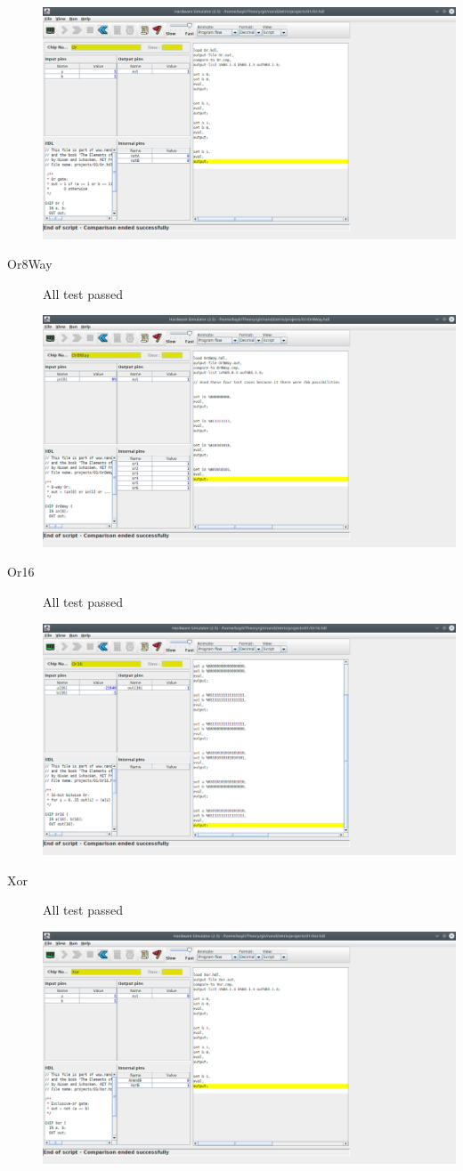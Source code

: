 \documentclass[titlepage]{article}
\begin{document}
\begin{description}
{    \includegraphics[width=.9\textwidth]{01/Or.png}
  }
  \item[Or8Way]{
    All test passed

    \includegraphics[width=.9\textwidth]{01/Or8Way.png}
  }
  \item[Or16]{
    All test passed

    \includegraphics[width=.9\textwidth]{01/Or16.png}
  }
  \item[Xor]{
    All test passed

    \includegraphics[width=.9\textwidth]{01/Xor.png}
  }
\end{description}
\end{document}
